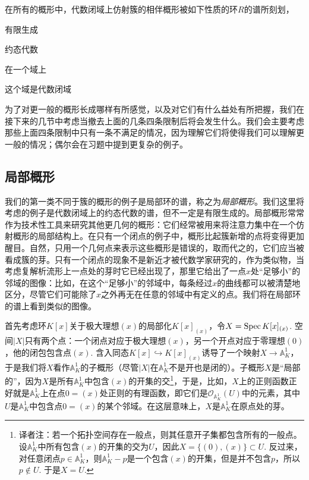 在所有的概形中，代数闭域上仿射簇的相伴概形被如下性质的环$R$的谱所刻划，
\begin{compactitem}[~~~--]
\item 有限生成
\item 约态代数
\item 在一个域上
\item 这个域是代数闭域
\end{compactitem}

为了对更一般的概形长成哪样有所感觉，以及对它们有什么益处有所把握，我们在接下来的几节中考虑当撤去上面的几条四条限制后将会发生什么。我们会主要考虑那些上面四条限制中只有一条不满足的情况，因为理解它们将使得我们可以理解更一般的情况；偶尔会在习题中提到更复杂的例子。

\subsection{局部概形}

我们的第一类不同于簇的概形的例子是局部环的谱，称之为\textit{局部概形}。我们这里将考虑的例子是代数闭域上的约态代数的谱，但不一定是有限生成的。局部概形常常作为技术性工具来研究其他更几何的概形：它们经常被用来将注意力集中在一个仿射概形的局部结构上。在只有一个闭点的例子中，概形比起簇新增的点将变得更加醒目。自然，只用一个几何点来表示这些概形是错误的，取而代之的，它们应当被看成簇的芽。只有一个闭点的现象不是新近才被代数学家研究的，作为类似物，当考虑复解析流形上一点处的芽时它已经出现了，那里它给出了一点$x$处“足够小”的邻域的图像：比如，在这个“足够小”的邻域中，每条经过$x$的曲线都可以被清楚地区分，尽管它们可能除了$x$之外再无在任意的邻域中有定义的点。我们将在局部环的谱上看到类似的图像。

首先考虑环$K[x]$关于极大理想$(x)$的局部化$K[x]_{(x)}$，令$X=\operatorname{Spec} K[x]_{(x)}$. 空间$|X|$只有两个点：一个闭点对应于极大理想$(x)$，另一个开点对应于零理想$(0)$，他的闭包包含点$(x)$. 含入同态$K[x]\hookrightarrow K[x]_{(x)}$诱导了一个映射$X\to \mathbb{A}_K^1$，于是我们将$X$看作$\mathbb{A}_K^1$的子概形（尽管$|X|$在$\mathbb{A}_K^1$不是开也是闭的）。子概形$X$是“局部的”，因为$X$是所有$\mathbb{A}_K^1$中包含$(x)$的开集的交\footnote{译者注：若一个拓扑空间存在一般点，则其任意开子集都包含所有的一般点。设$\mathbb{A}_K^1$中所有包含$(x)$的开集的交为$U$，因此$X=\{(0),(x)\}\subset U$. 反过来，对任意闭点$p\in \mathbb{A}_K^1$，则$\mathbb{A}_K^1-p$是一个包含$(x)$的开集，但是并不包含$p$，所以$p\not\in U$. 于是$X=U$.}，于是，比如，$X$上的正则函数正好就是$\mathbb{A}_K^1$上在点$0=(x)$处正则的有理函数，即它们是$\mathscr{O}_{\mathbb{A}_K^1}(U)$中的元素，其中$U$是$\mathbb{A}_K^1$中包含点$0=(x)$的某个邻域。在这层意味上，$X$是$\mathbb{A}_K^1$在原点处的芽。

